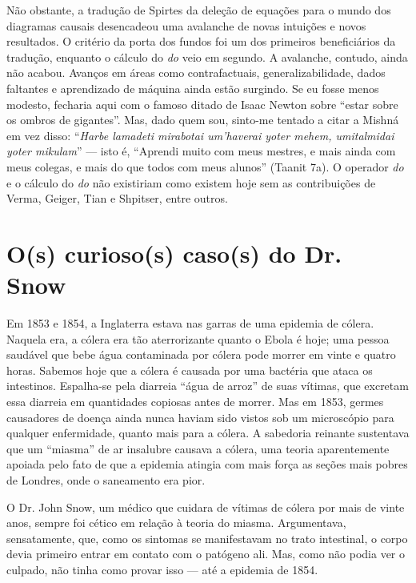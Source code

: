 \documentclass[11pt,a5paper,twoside]{book}
\begin{document}
Não obstante, a tradução de Spirtes da deleção de equações para o mundo dos diagramas causais desencadeou uma avalanche de novas intuições e novos resultados. O critério da porta dos fundos foi um dos primeiros beneficiários da tradução, enquanto o cálculo do \textit{do} veio em segundo. A avalanche, contudo, ainda não acabou. Avanços em áreas como contrafactuais, generalizabilidade, dados faltantes e aprendizado de máquina ainda estão surgindo. Se eu fosse menos modesto, fecharia aqui com o famoso ditado de Isaac Newton sobre “estar sobre os ombros de gigantes”. Mas, dado quem sou, sinto-me tentado a citar a Mishná em vez disso: “\textit{Harbe lamadeti mirabotai um’haverai yoter mehem, umitalmidai yoter mikulam}” — isto é, “Aprendi muito com meus mestres, e mais ainda com meus colegas, e mais do que todos com meus alunos” (Taanit 7a). O operador \textit{do} e o cálculo do \textit{do} não existiriam como existem hoje sem as contribuições de Verma, Geiger, Tian e Shpitser, entre outros.

\section{O(s) curioso(s) caso(s) do Dr. Snow}
Em 1853 e 1854, a Inglaterra estava nas garras de uma epidemia de cólera. Naquela era, a cólera era tão aterrorizante quanto o Ebola é hoje; uma pessoa saudável que bebe água contaminada por cólera pode morrer em vinte e quatro horas. Sabemos hoje que a cólera é causada por uma bactéria que ataca os intestinos. Espalha-se pela diarreia “água de arroz” de suas vítimas, que excretam essa diarreia em quantidades copiosas antes de morrer. Mas em 1853, germes causadores de doença ainda nunca haviam sido vistos sob um microscópio para qualquer enfermidade, quanto mais para a cólera. A sabedoria reinante sustentava que um “miasma” de ar insalubre causava a cólera, uma teoria aparentemente apoiada pelo fato de que a epidemia atingia com mais força as seções mais pobres de Londres, onde o saneamento era pior.

O Dr. John Snow, um médico que cuidara de vítimas de cólera por mais de vinte anos, sempre foi cético em relação à teoria do miasma. Argumentava, sensatamente, que, como os sintomas se manifestavam no trato intestinal, o corpo devia primeiro entrar em contato com o patógeno ali. Mas, como não podia ver o culpado, não tinha como provar isso — até a epidemia de 1854.
\end{document}
